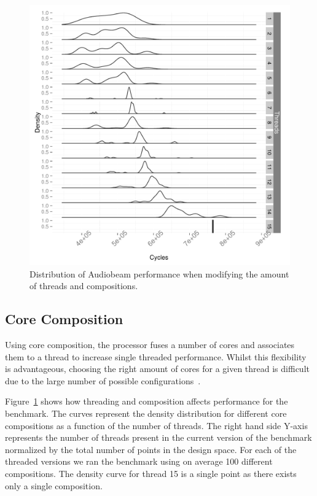 \begin{figure}[t]
  \includegraphics[width=1\textwidth]{streamit-paper/graphics/audiobeam_tots.pdf}
  \caption{Distribution of Audiobeam performance when modifying the amount of threads and compositions.}\label{fig:audiototal}
\end{figure}

\subsection{Core Composition}

Using core composition, the processor fuses a number of cores and associates them to a thread to increase single threaded performance.
Whilst this flexibility is advantageous, choosing the right amount of cores for a given thread is difficult due to the large number of possible configurations~\cite{gulati2008multitaskingdmc}.

Figure~\ref{fig:audiototal} shows how threading and composition affects performance for the  benchmark.
The curves represent the density distribution for different core compositions as a function of the number of threads.
The right hand side Y-axis represents the number of threads present in the current version of the benchmark normalized by the total number of points in the design space.
For each of the threaded versions we ran the benchmark using on average 100 different compositions.
The density curve for thread 15 is a single point as there exists only a single composition.


